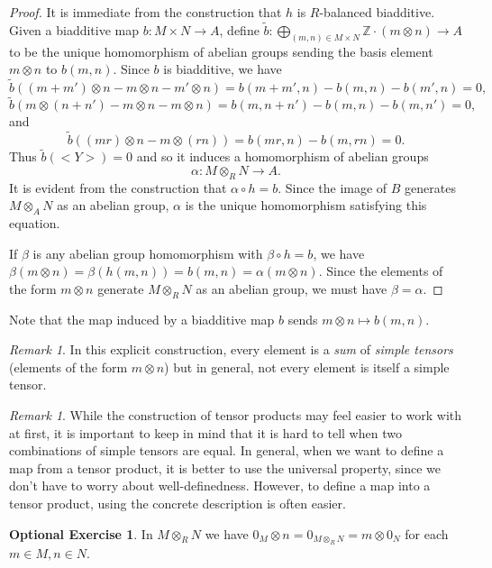 \documentclass{amsart}[12pt]
\newcommand{\Z}{\mathbb{Z}}
\newcommand{\DEF}[1]{\emph{#1}\index{#1}}
\numberwithin{equation}{section}
\theoremstyle{plain} %
\theoremstyle{definition}
\newtheorem{exer}[equation]{Optional Exercise}
\theoremstyle{remark}
\newtheorem{rem}[equation]{Remark}
\begin{document}
\begin{proof}
It is immediate from the construction that $h$ is $R$-balanced biadditive. 
Given a biadditive map  $b: M \times N \to A$, define $\tilde{b}: \bigoplus_{(m,n) \in M \times N} \Z  \cdot (m \otimes n) \to A$ to be the unique homomorphism of abelian groups  
sending the basis element $m \otimes n$  to $b(m,n)$. Since $b$ is biadditive, we have
$$
\tilde{b}((m + m') \otimes  n -m \otimes n - m' \otimes n) =
b(m + m',n) - b(m,n) - b(m',n) = 0,
$$
$$
\tilde{b}(m \otimes  (n +n') - m \otimes n - m \otimes n)
= b(m, n+n') - b(m,n) - b(m,n') = 0,
$$
and
$$
\tilde{b}((mr) \otimes  n  - m \otimes (rn)) = b(mr,n) - b(m,rn) = 0.
$$
Thus $\tilde{b}(<Y>) = 0$  and so it induces a homomorphism of abelian groups
$$
\alpha: M \otimes_R N \to A.
$$
It is evident from the construction that $\alpha \circ h = b$. Since the image of $B$ generates $M \otimes_A N$ as an abelian group, $\alpha$ is the unique
homomorphism satisfying this equation.

If $\beta$ is any abelian group homomorphism with $\beta\circ h=b$, we have $\beta(m\otimes n) = \beta(h(m,n))=b(m,n)=\alpha(m\otimes n)$. Since the elements of the form $m\otimes n$ generate $M\otimes_R N$ as an abelian group, we must have $\beta=\alpha$.
\end{proof}

Note that the map induced by a biadditive map $b$ sends $m\otimes n\mapsto b(m,n)$.

\begin{rem} In this explicit construction, every element is a \emph{sum} of \DEF{simple tensors} (elements of the form $m\otimes n$) but in general, not every element is itself a simple tensor.
\end{rem}

\begin{rem} While the construction of tensor products may feel easier to work with at first, it is important to keep in mind that it is hard to tell when two combinations of simple tensors are equal. In general, when we want to define a map from a tensor product, it is better to use the universal property, since we don't have to worry about well-definedness. However, to define a map into a tensor product, using the concrete description is often easier.
\end{rem}



\begin{exer}
In $M\otimes_RN$ we have $0_M\otimes n=0_{M\otimes_R N} =m\otimes 0_N$ for each $m\in M,n\in N$.
\end{exer}
\end{document}
